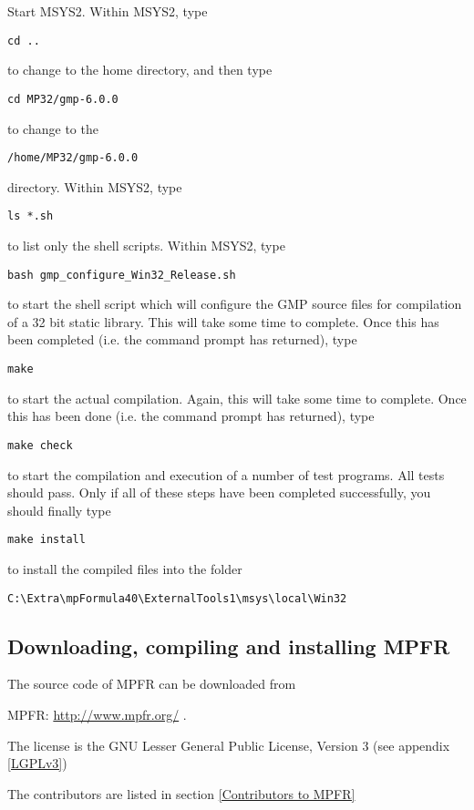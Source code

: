\vpara
Start MSYS2. Within MSYS2, type
\begin{verbatim}
cd ..
\end{verbatim}
to change to the home directory, and then type 
\begin{verbatim}
cd MP32/gmp-6.0.0
\end{verbatim}
to change to the
\begin{verbatim}
/home/MP32/gmp-6.0.0
\end{verbatim}
directory. Within MSYS2, type
\begin{verbatim}
ls *.sh
\end{verbatim}
to list only the shell scripts. Within MSYS2, type
\begin{verbatim}
bash gmp_configure_Win32_Release.sh
\end{verbatim}
to start the shell script which will configure the GMP source files for compilation of a 32 bit static library. This will take some time to complete. Once this has been completed (i.e. the command prompt has returned), type
\begin{verbatim}
make
\end{verbatim}
to start the actual compilation. Again, this will take some time to complete. Once this has been done (i.e. the command prompt has returned), type
\begin{verbatim}
make check
\end{verbatim}
to start the compilation and execution of a number of test programs. All tests should pass. Only if all of these steps have been completed successfully, you should finally type
\begin{verbatim}
make install
\end{verbatim}
to install the compiled files into the folder
\begin{verbatim}
C:\Extra\mpFormula40\ExternalTools1\msys\local\Win32
\end{verbatim}



\newpage
\subsection{Downloading, compiling and installing MPFR}
The source code of MPFR can be downloaded from

MPFR: \href{http://www.mpfr.org/}{http://www.mpfr.org/} . 

The license is the GNU Lesser General Public License, Version 3 (see appendix \ref{LGPLv3})

The contributors are listed in section \ref{Contributors to MPFR}

